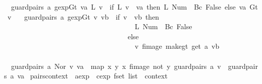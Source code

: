 \begin{isabellebody}
\ \ {\isachardoublequoteopen}guard{}pairs\ a\ {\isacharparenleft}gexp{\isachardot}Gt\ va\ {\isacharparenleft}L\ v{\isacharparenright}{\isacharparenright}\ {\isacharequal}\ {\isacharparenleft}if\ L\ v\ {\isacharequal}\ va\ then\ {\isacharbrackleft}{\isacharparenleft}L\ {\isacharparenleft}Num\ {}{\isacharparenright}{\isacharcomma}\ {\isacharbraceleft}{\isacharbar}Bc\ False{\isacharbar}{\isacharbraceright}{\isacharparenright}{\isacharbrackright}\ else\ {\isacharbrackleft}{\isacharparenleft}va{\isacharcomma}\ {\isacharbraceleft}{\isacharbar}Gt\ v{\isacharbar}{\isacharbraceright}{\isacharparenright}{\isacharbrackright}{\isacharparenright}{\isachardoublequoteclose}\ {\isacharbar}\isanewline
\ \ {\isachardoublequoteopen}guard{}pairs\ a\ {\isacharparenleft}gexp{\isachardot}Gt\ v\ vb{\isacharparenright}\ {\isacharequal}\ {\isacharparenleft}if\ v\ {\isacharequal}\ vb\ then\isanewline
\ \ \ \ \ \ \ \ \ \ \ \ \ \ \ \ \ \ \ \ \ \ \ \ \ \ \ \ \ \ \ \ \ \ \ \ \ {\isacharbrackleft}{\isacharparenleft}L\ {\isacharparenleft}Num\ {}{\isacharparenright}{\isacharcomma}\ {\isacharbraceleft}{\isacharbar}Bc\ False{\isacharbar}{\isacharbraceright}{\isacharparenright}{\isacharbrackright}\isanewline
\ \ \ \ \ \ \ \ \ \ \ \ \ \ \ \ \ \ \ \ \ \ \ \ \ \ \ \ \ \ \ \ \ \ \ else\isanewline
\ \ \ \ \ \ \ \ \ \ \ \ \ \ \ \ \ \ \ \ \ \ \ \ \ \ \ \ \ \ \ \ \ \ \ \ \ {\isacharbrackleft}{\isacharparenleft}v{\isacharcomma}\ fimage\ make{\isacharunderscore}gt\ {\isacharparenleft}get\ a\ vb{\isacharparenright}{\isacharparenright}{\isacharbrackright}\isanewline
\ \ \ \ \ \ \ \ \ \ \ \ \ \ \ \ \ \ \ \ \ \ \ \ \ \ \ \ \ \ \ \ \ \ {\isacharparenright}{\isachardoublequoteclose}\ {\isacharbar}\isanewline
\isanewline
\ \ {\isachardoublequoteopen}guard{}pairs\ a\ {\isacharparenleft}Nor\ v\ va{\isacharparenright}\ {\isacharequal}\ {\isacharparenleft}map\ {\isacharparenleft}{\isasymlambda}{\isacharparenleft}x{\isacharcomma}\ y{\isacharparenright}{\isachardot}\ {\isacharparenleft}x{\isacharcomma}\ fimage\ not\ y{\isacharparenright}{\isacharparenright}\ {\isacharparenleft}{\isacharparenleft}guard{}pairs\ a\ v{\isacharparenright}\ {\isacharat}\ {\isacharparenleft}guard{}pairs\ a\ va{\isacharparenright}{\isacharparenright}{\isacharparenright}{\isachardoublequoteclose}\isanewline
\isanewline
{}\isamarkupfalse%
\ pairs{}context\ {\isacharcolon}{\isacharcolon}\ {\isachardoublequoteopen}{\isacharparenleft}aexp\ {\isasymtimes}\ cexp\ fset{\isacharparenright}\ list\ {\isasymRightarrow}\ context{\isachardoublequoteclose}\ \isanewline

\end{isabellebody}
